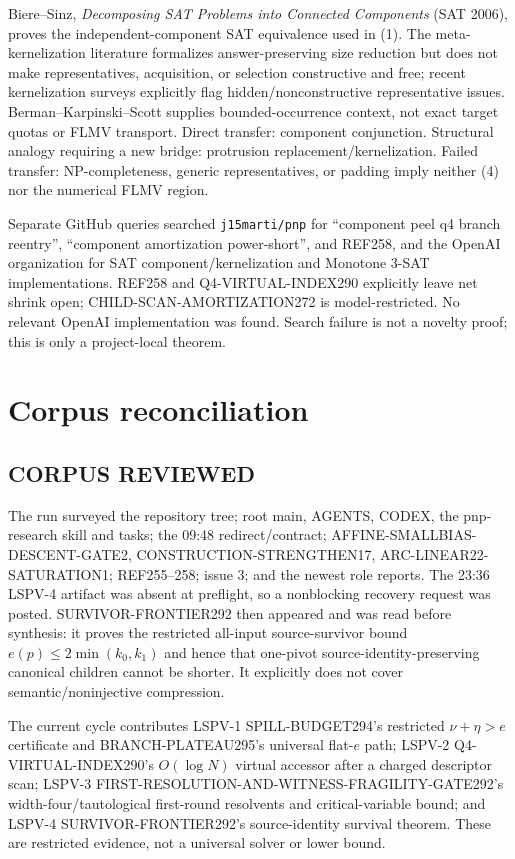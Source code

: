 \documentclass[11pt]{article}
\begin{document}
Biere--Sinz, \emph{Decomposing SAT Problems into Connected Components} (SAT 2006), proves the independent-component SAT equivalence used in (1).  The meta-kernelization literature formalizes answer-preserving size reduction but does not make representatives, acquisition, or selection constructive and free; recent kernelization surveys explicitly flag hidden/nonconstructive representative issues.  Berman--Karpinski--Scott supplies bounded-occurrence context, not exact target quotas or FLMV transport.  Direct transfer: component conjunction.  Structural analogy requiring a new bridge: protrusion replacement/kernelization.  Failed transfer: NP-completeness, generic representatives, or padding imply neither (4) nor the numerical FLMV region.

Separate GitHub queries searched \texttt{j15marti/pnp} for ``component peel q4 branch reentry'', ``component amortization power-short'', and REF258, and the OpenAI organization for SAT component/kernelization and Monotone 3-SAT implementations.  REF258 and Q4-VIRTUAL-INDEX290 explicitly leave net shrink open; CHILD-SCAN-AMORTIZATION272 is model-restricted.  No relevant OpenAI implementation was found.  Search failure is not a novelty proof; this is only a project-local theorem.

\section{Corpus reconciliation}
\subsection*{CORPUS REVIEWED}
The run surveyed the repository tree; root main, AGENTS, CODEX, the pnp-research skill and tasks; the 09:48 redirect/contract; AFFINE-SMALLBIAS-DESCENT-GATE2, CONSTRUCTION-STRENGTHEN17, ARC-LINEAR22-SATURATION1; REF255--258; issue 3; and the newest role reports.  The 23:36 LSPV-4 artifact was absent at preflight, so a nonblocking recovery request was posted.  SURVIVOR-FRONTIER292 then appeared and was read before synthesis: it proves the restricted all-input source-survivor bound $e(p)\le2\min(k_0,k_1)$ and hence that one-pivot source-identity-preserving canonical children cannot be shorter.  It explicitly does not cover semantic/noninjective compression.

The current cycle contributes LSPV-1 SPILL-BUDGET294's restricted $\nu+\eta>e$ certificate and BRANCH-PLATEAU295's universal flat-$e$ path; LSPV-2 Q4-VIRTUAL-INDEX290's $O(\log N)$ virtual accessor after a charged descriptor scan; LSPV-3 FIRST-RESOLUTION-AND-WITNESS-FRAGILITY-GATE292's width-four/tautological first-round resolvents and critical-variable bound; and LSPV-4 SURVIVOR-FRONTIER292's source-identity survival theorem.  These are restricted evidence, not a universal solver or lower bound.
\end{document}
